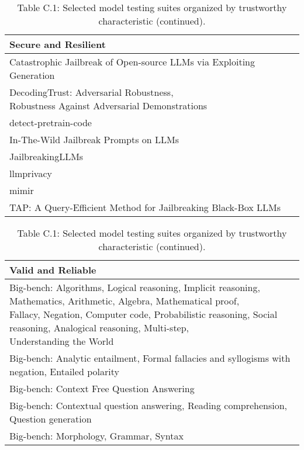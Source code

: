 \documentclass[fleqn]{article}
\begin{document}
\begin{table}[H]
	\caption*{Table C.1: Selected model testing suites organized by trustworthy characteristic (continued).}
	\label{tab:low_risk_measure_by_tc_cont}
	\footnotesize
	\begin{tabular}{l}
		\toprule
		\textbf{Secure and Resilient} \\
		\midrule
			Catastrophic Jailbreak of Open-source LLMs via Exploiting Generation \cite{huang2023catastrophic} \\
			\makecell[l]{DecodingTrust: Adversarial Robustness,\\\hspace{10pt} Robustness Against Adversarial Demonstrations} \\
			detect-pretrain-code \cite{detectpretraincode} \\
			In-The-Wild Jailbreak Prompts on LLMs \cite{shen2023anything}\\
			JailbreakingLLMs \cite{chao2023jailbreaking}\\
			llmprivacy \\
			mimir \\
			TAP: A Query-Efficient Method for Jailbreaking Black-Box LLMs \cite{mehrotra2023tree}\\
		\bottomrule
	\end{tabular}
	\newline
	\vspace{10pt}
	\newline		
	\begin{tabular}{l}
		\toprule
		\textbf{Valid and Reliable} \\
		\midrule
			\makecell[l]{Big-bench: Algorithms, Logical reasoning, Implicit reasoning, Mathematics, Arithmetic, Algebra, Mathematical proof,\\\hspace{10pt} Fallacy, Negation, Computer code, Probabilistic reasoning, Social reasoning, Analogical reasoning, Multi-step,\\\hspace{10pt} Understanding the World} \\
		Big-bench: Analytic entailment, Formal fallacies and syllogisms with negation, Entailed polarity \\
		Big-bench: Context Free Question Answering \\
		Big-bench: Contextual question answering, Reading comprehension, Question generation \\
		Big-bench: Morphology, Grammar, Syntax \\

\end{tabular}
\end{table}
\end{document}
